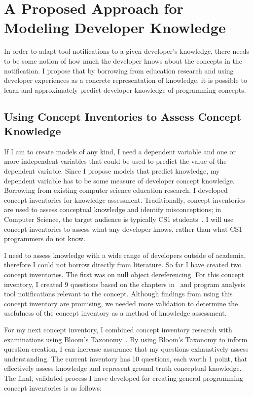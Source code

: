 \documentclass{llncs}
\begin{document}
\section{A Proposed Approach for Modeling Developer Knowledge}
In order to adapt tool notifications to a given developer's knowledge, there needs to be some notion of how much the developer knows about the concepts in the notification. I propose that by borrowing from education research and using developer experiences as a concrete representation of knowledge, it is possible to learn and approximately predict developer knowledge of programming concepts.

\subsection{Using Concept Inventories to Assess Concept Knowledge}
If I am to create models of any kind, I need a dependent variable and one or more independent variables that could be used to predict the value of the dependent variable. Since I propose models that predict knowledge, my dependent variable has to be some measure of developer concept knowledge.
Borrowing from existing computer science education research, I developed concept inventories for knowledge assessment. Traditionally, concept inventories are used to  assess conceptual knowledge and identify misconceptions; in Computer Science, the target audience is typically CS1 students~\cite{tew2010developing,kaczmarczyk2010identifying}. I will use concept inventories to assess what any developer knows, rather than what CS1 programmers do not know.

I need to assess knowledge with a wide range of developers outside of academia, therefore I could not borrow directly from literature. So far I have created two concept inventories. The first was on null object dereferencing. For this concept inventory, I created 9 questions based on the chapters in~\cite{stuart2011building} and program analysis tool notifications relevant to the concept. Although findings from using this concept inventory are promising, we needed more validation to determine the usefulness of the concept inventory as a method of knowledge assessment. 

For my next concept inventory, I combined concept inventory research with examinations using Bloom's Taxonomy~\cite{tew2010developing,nelson1967testing,scott2003bloom}. By using Bloom's Taxonomy to inform question creation, I can increase assurance that my questions exhaustively assess understanding. The current inventory has 10 questions, each worth 1 point, that effectively assess knowledge and represent ground truth conceptual knowledge. The final, validated process I have developed for creating general programming concept inventories is as follows:
\end{document}
